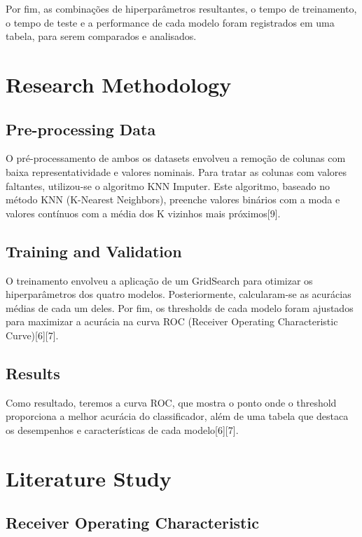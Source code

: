 \documentclass[conference]{IEEEtran}
\begin{document}
Por fim, as combinações de hiperparâmetros resultantes, o tempo de treinamento, o tempo de teste e a performance de cada modelo foram registrados em uma tabela, para serem comparados e analisados.

\section{Research Methodology}

\subsection{Pre-processing Data}

O pré-processamento de ambos os datasets envolveu a remoção de colunas com baixa representatividade e valores nominais. Para tratar as colunas com valores faltantes, utilizou-se o algoritmo KNN Imputer. Este algoritmo, baseado no método KNN (K-Nearest Neighbors), preenche valores binários com a moda e valores contínuos com a média dos K vizinhos mais próximos[9].

\subsection{Training and Validation}

O treinamento envolveu a aplicação de um GridSearch para otimizar os hiperparâmetros dos quatro modelos. Posteriormente, calcularam-se as acurácias médias de cada um deles. Por fim, os thresholds de cada modelo foram ajustados para maximizar a acurácia na curva ROC (Receiver Operating Characteristic Curve)[6][7].

\subsection{Results}

Como resultado, teremos a curva ROC, que mostra o ponto onde o threshold proporciona a melhor acurácia do classificador, além de uma tabela que destaca os desempenhos e características de cada modelo[6][7].

\section{Literature Study}

\subsection{Receiver Operating Characteristic}
\end{document}
